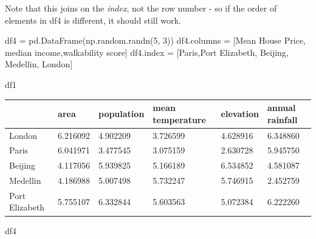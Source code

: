 \documentclass[
  letterpaper,
  DIV=11,
  numbers=noendperiod]{scrreprt}
\newenvironment{Shaded}{\begin{snugshade}}{\end{snugshade}}
\newcommand{\DecValTok}[1]{\textcolor[rgb]{0.68,0.00,0.00}{#1}}
\newcommand{\NormalTok}[1]{\textcolor[rgb]{0.00,0.23,0.31}{#1}}
\newcommand{\OperatorTok}[1]{\textcolor[rgb]{0.37,0.37,0.37}{#1}}
\newcommand{\StringTok}[1]{\textcolor[rgb]{0.13,0.47,0.30}{#1}}
\begin{document}
Note that this joins on the \emph{index}, not the row number - so if the
order of elements in df4 is different, it should still work.

\begin{Shaded}
\begin{Highlighting}[]
\NormalTok{df4 }\OperatorTok{=}\NormalTok{ pd.DataFrame(np.random.randn(}\DecValTok{5}\NormalTok{, }\DecValTok{3}\NormalTok{))}
\NormalTok{df4.columns }\OperatorTok{=}\NormalTok{ [}\StringTok{\textquotesingle{}Mean House Price\textquotesingle{}}\NormalTok{, }\StringTok{\textquotesingle{}median income\textquotesingle{}}\NormalTok{,}\StringTok{\textquotesingle{}walkability score\textquotesingle{}}\NormalTok{]}
\NormalTok{df4.index }\OperatorTok{=}\NormalTok{ [}\StringTok{\textquotesingle{}Paris\textquotesingle{}}\NormalTok{,}\StringTok{\textquotesingle{}Port Elizabeth\textquotesingle{}}\NormalTok{, }\StringTok{\textquotesingle{}Beijing\textquotesingle{}}\NormalTok{, }\StringTok{\textquotesingle{}Medellin\textquotesingle{}}\NormalTok{, }\StringTok{\textquotesingle{}London\textquotesingle{}}\NormalTok{]}
\end{Highlighting}
\end{Shaded}

\begin{Shaded}
\begin{Highlighting}[]
\NormalTok{df1}
\end{Highlighting}
\end{Shaded}

\begin{longtable}[]{@{}llllll@{}}
\toprule\noalign{}
& area & population & mean temperature & elevation & annual rainfall \\
\midrule\noalign{}
\endhead
\bottomrule\noalign{}
\endlastfoot
London & 6.216092 & 4.902209 & 3.726599 & 4.628916 & 6.348860 \\
Paris & 6.041971 & 3.477545 & 3.075159 & 2.630728 & 5.945750 \\
Beijing & 4.117056 & 5.939825 & 5.166189 & 6.534852 & 4.581087 \\
Medellin & 4.186988 & 5.007498 & 5.732247 & 5.746915 & 2.452759 \\
Port Elizabeth & 5.755107 & 6.332844 & 5.603563 & 5.072384 & 6.222260 \\
\end{longtable}

\begin{Shaded}
\begin{Highlighting}[]
\NormalTok{df4}
\end{Highlighting}
\end{Shaded}
\end{document}
